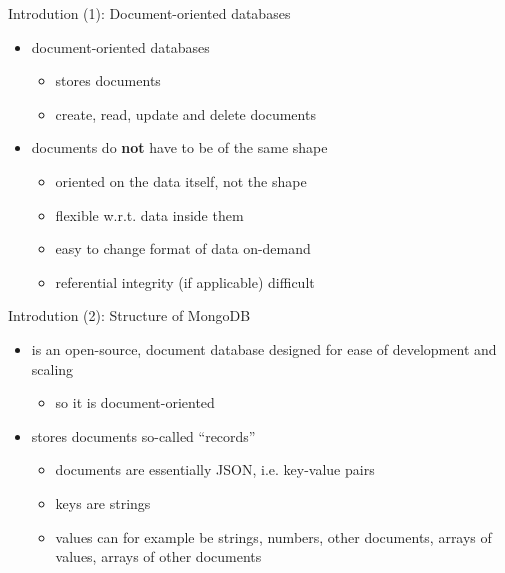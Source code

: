 \begin{frame}{Introdution (1): Document-oriented databases}
  \begin{itemize}
    \item document-oriented databases
    \begin{itemize}
      \item stores documents
      \item create, read, update and delete documents
    \end{itemize}
    \item documents do \textbf{not} have to be of the same shape
    \begin{itemize}
      \item oriented on the data itself, not the shape
      \item flexible w.r.t. data inside them
      \item easy to change format of data on-demand
      \item referential integrity (if applicable) difficult
    \end{itemize}
  \end{itemize}
\end{frame}

\begin{frame}[fragile]{Introdution (2): Structure of MongoDB}
  \begin{itemize}
    \item {} is an open-source, document database designed for ease of development and scaling
    \begin{itemize}
      \item{so it is document-oriented}
    \end{itemize}
    \item stores documents so-called ``records''
    \begin{itemize}
      \item documents are essentially JSON, i.e. key-value pairs
      \item keys are strings
      \item values can for example be strings, numbers, other documents, arrays of values, arrays of other documents
    \end{itemize}
  \end{itemize}
\end{frame}

